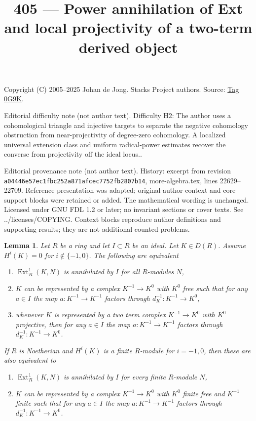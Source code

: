 \documentclass{amsart}
\theoremstyle{plain}
\newtheorem{lemma}[subsection]{Lemma}
\theoremstyle{definition}
\theoremstyle{remark}
\numberwithin{equation}{subsection}
\def\Ext{\mathop{\mathrm{Ext}}\nolimits}
\begin{document}
\title[Stacks Project, Tag 0G9K]{405 --- Power annihilation of Ext and local projectivity of a two-term derived object}
\maketitle
\noindent Copyright (C) 2005--2025 Johan de Jong. Stacks Project authors. Source: \href{https://stacks.math.columbia.edu/tag/0G9K}{Tag 0G9K}.

\noindent Editorial difficulty note (not author text). Difficulty H2: The author uses a cohomological triangle and injective targets to separate the negative cohomology obstruction from near-projectivity of degree-zero cohomology. A localized universal extension class and uniform radical-power estimates recover the converse from projectivity off the ideal locus..

\noindent Editorial provenance note (not author text). History: excerpt from revision \texttt{a0444\allowbreak 6e57e\allowbreak c1fbc\allowbreak 252a8\allowbreak 71afc\allowbreak ec775\allowbreak 2fb28\allowbreak 07b14}, more-algebra.tex, lines 22629--22709. Reference presentation was adapted; original-author context and core support blocks were retained or added. The mathematical wording is unchanged. Licensed under GNU FDL 1.2 or later; no invariant sections or cover texts. See ../licenses/COPYING. Context blocks reproduce author definitions and supporting results; they are not additional counted problems.

\begin{lemma}
\label{lemma-ext-1-annihilated-definite}
Let $R$ be a ring and let $I \subset R$ be an ideal.
Let $K \in D(R)$. Assume $H^i(K) = 0$ for $i \not \in \{-1, 0\}$.
The following are equivalent
\begin{enumerate}
\item $\Ext^1_R(K, N)$ is annihilated by $I$ for all $R$-modules $N$,
\item $K$ can be represented by a complex $K^{-1} \to K^0$
with $K^0$ free such that for any $a \in I$ the map
$a : K^{-1} \to K^{-1}$ factors through $d_K^{-1} : K^{-1} \to K^0$,
\item whenever $K$ is represented by a two term complex
$K^{-1} \to K^0$ with $K^0$ projective, then for any $a \in I$ the map
$a : K^{-1} \to K^{-1}$ factors through $d_K^{-1} : K^{-1} \to K^0$.
\end{enumerate}
If $R$ is Noetherian and $H^i(K)$ is a finite $R$-module for $i = -1, 0$,
then these are also equivalent to
\begin{enumerate}
\item[(4)] $\Ext^1_R(K, N)$ is annihilated by $I$ for every finite
$R$-module $N$,
\item[(5)] $K$ can be represented by a complex $K^{-1} \to K^0$
with $K^0$ finite free and $K^{-1}$ finite such that for any $a \in I$ the map
$a : K^{-1} \to K^{-1}$ factors through $d_K^{-1} : K^{-1} \to K^0$.
\end{enumerate}
\end{lemma}
\end{document}
